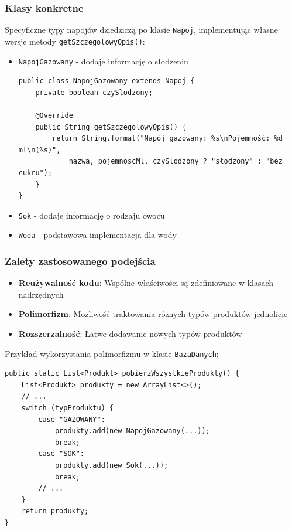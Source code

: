 \subsubsection{Klasy konkretne}
Specyficzne typy napojów dziedziczą po klasie \texttt{Napoj}, implementując własne wersje metody \texttt{getSzczegolowyOpis()}:

\begin{itemize}
\item \texttt{NapojGazowany} - dodaje informację o słodzeniu
\begin{lstlisting}[style=javaStyle, firstnumber=1]
public class NapojGazowany extends Napoj {
    private boolean czySlodzony;
    
    @Override
    public String getSzczegolowyOpis() {
        return String.format("Napój gazowany: %s\nPojemność: %d ml\n(%s)",
            nazwa, pojemnoscMl, czySlodzony ? "słodzony" : "bez cukru");
    }
}
\end{lstlisting}

\item \texttt{Sok} - dodaje informację o rodzaju owocu
\item \texttt{Woda} - podstawowa implementacja dla wody
\end{itemize}

\subsubsection{Zalety zastosowanego podejścia}
\begin{itemize}
\item \textbf{Reużywalność kodu}: Wspólne właściwości są zdefiniowane w klasach nadrzędnych
\item \textbf{Polimorfizm}: Możliwość traktowania różnych typów produktów jednolicie
\item \textbf{Rozszerzalność}: Łatwe dodawanie nowych typów produktów
\end{itemize}

Przykład wykorzystania polimorfizmu w klasie \texttt{BazaDanych}:

\begin{lstlisting}[style=javaStyle]
public static List<Produkt> pobierzWszystkieProdukty() {
    List<Produkt> produkty = new ArrayList<>();
    // ...
    switch (typProduktu) {
        case "GAZOWANY":
            produkty.add(new NapojGazowany(...));
            break;
        case "SOK":
            produkty.add(new Sok(...));
            break;
        // ...
    }
    return produkty;
}
\end{lstlisting}


